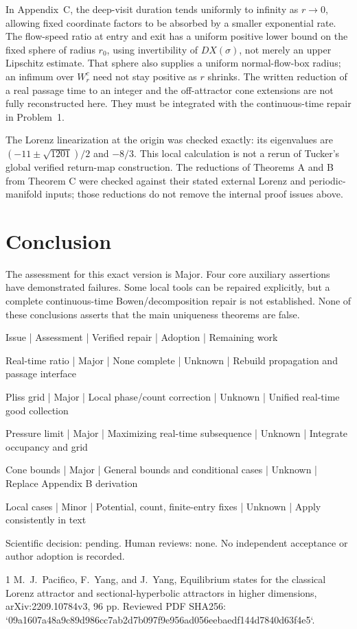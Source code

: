 \documentclass[10pt]{article}
\begin{document}
In Appendix C, the deep-visit duration tends uniformly to infinity as \(r\to0\), allowing fixed coordinate factors to be absorbed by a smaller exponential rate. The flow-speed ratio at entry and exit has a uniform positive lower bound on the fixed sphere of radius \(r_0\), using invertibility of \(DX(\sigma)\), not merely an upper Lipschitz estimate. That sphere also supplies a uniform normal-flow-box radius; an infimum over \(W_r^c\) need not stay positive as \(r\) shrinks. The written reduction of a real passage time to an integer and the off-attractor cone extensions are not fully reconstructed here. They must be integrated with the continuous-time repair in Problem 1.\par
The Lorenz linearization at the origin was checked exactly: its eigenvalues are \((-11\pm\sqrt{1201})/2\) and \(-8/3\). This local calculation is not a rerun of Tucker’s global verified return-map construction. The reductions of Theorems A and B from Theorem C were checked against their stated external Lorenz and periodic-manifold inputs; those reductions do not remove the internal proof issues above.\par
\section*{Conclusion}
The assessment for this exact version is Major. Four core auxiliary assertions have demonstrated failures. Some local tools can be repaired explicitly, but a complete continuous-time Bowen/decomposition repair is not established. None of these conclusions asserts that the main uniqueness theorems are false.\par
Issue | Assessment | Verified repair | Adoption | Remaining work\par
Real-time ratio | Major | None complete | Unknown | Rebuild propagation and passage interface\par
Pliss grid | Major | Local phase/count correction | Unknown | Unified real-time good collection\par
Pressure limit | Major | Maximizing real-time subsequence | Unknown | Integrate occupancy and grid\par
Cone bounds | Major | General bounds and conditional cases | Unknown | Replace Appendix B derivation\par
Local cases | Minor | Potential, count, finite-entry fixes | Unknown | Apply consistently in text\par
Scientific decision: pending. Human reviews: none. No independent acceptance or author adoption is recorded.\par
1 M. J. Pacifico, F. Yang, and J. Yang, Equilibrium states for the classical Lorenz attractor and sectional-hyperbolic attractors in higher dimensions, arXiv:2209.10784v3, 96 pp. Reviewed PDF SHA256: `09a1607a48a9c89d986cc7ab2d7b097f9e956ad056eebaedf144d7840d63f4e5`.\par
\end{document}
